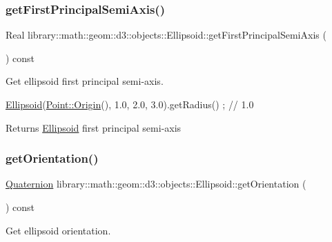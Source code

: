 \subsubsection{\texorpdfstring{get\+First\+Principal\+Semi\+Axis()}{getFirstPrincipalSemiAxis()}}
{\footnotesize\ttfamily Real library\+::math\+::geom\+::d3\+::objects\+::\+Ellipsoid\+::get\+First\+Principal\+Semi\+Axis (\begin{DoxyParamCaption}{ }\end{DoxyParamCaption}) const}



Get ellipsoid first principal semi-\/axis. 


\begin{DoxyCode}
\hyperlink{classlibrary_1_1math_1_1geom_1_1d3_1_1objects_1_1_ellipsoid_aae81fe0edc7f0e8d4590ea89ae73cb14}{Ellipsoid}(\hyperlink{classlibrary_1_1math_1_1geom_1_1d3_1_1objects_1_1_point_ab2a38e285c562e50bf350272c083986f}{Point::Origin}(), 1.0, 2.0, 3.0).getRadius() ; \textcolor{comment}{// 1.0}
\end{DoxyCode}


\begin{DoxyReturn}{Returns}
\hyperlink{classlibrary_1_1math_1_1geom_1_1d3_1_1objects_1_1_ellipsoid}{Ellipsoid} first principal semi-\/axis 
\end{DoxyReturn}
\mbox{\label{classlibrary_1_1math_1_1geom_1_1d3_1_1objects_1_1_ellipsoid_a8d426da587827eff577de4edb58ae417}} 
\subsubsection{\texorpdfstring{get\+Orientation()}{getOrientation()}}
{\footnotesize\ttfamily \hyperlink{classlibrary_1_1math_1_1geom_1_1trf_1_1rot_1_1_quaternion}{Quaternion} library\+::math\+::geom\+::d3\+::objects\+::\+Ellipsoid\+::get\+Orientation (\begin{DoxyParamCaption}{ }\end{DoxyParamCaption}) const}



Get ellipsoid orientation. 


